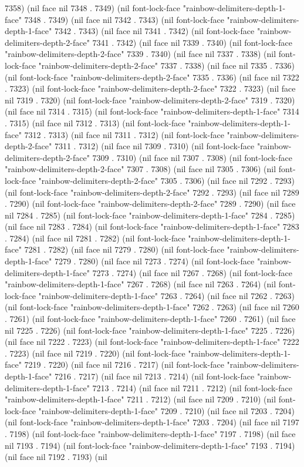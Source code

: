 7358) (nil face nil 7348 . 7349) (nil font-lock-face "rainbow-delimiters-depth-1-face" 7348 . 7349) (nil face nil 7342 . 7343) (nil font-lock-face "rainbow-delimiters-depth-1-face" 7342 . 7343) (nil face nil 7341 . 7342) (nil font-lock-face "rainbow-delimiters-depth-2-face" 7341 . 7342) (nil face nil 7339 . 7340) (nil font-lock-face "rainbow-delimiters-depth-2-face" 7339 . 7340) (nil face nil 7337 . 7338) (nil font-lock-face "rainbow-delimiters-depth-2-face" 7337 . 7338) (nil face nil 7335 . 7336) (nil font-lock-face "rainbow-delimiters-depth-2-face" 7335 . 7336) (nil face nil 7322 . 7323) (nil font-lock-face "rainbow-delimiters-depth-2-face" 7322 . 7323) (nil face nil 7319 . 7320) (nil font-lock-face "rainbow-delimiters-depth-2-face" 7319 . 7320) (nil face nil 7314 . 7315) (nil font-lock-face "rainbow-delimiters-depth-1-face" 7314 . 7315) (nil face nil 7312 . 7313) (nil font-lock-face "rainbow-delimiters-depth-1-face" 7312 . 7313) (nil face nil 7311 . 7312) (nil font-lock-face "rainbow-delimiters-depth-2-face" 7311 . 7312) (nil face nil 7309 . 7310) (nil font-lock-face "rainbow-delimiters-depth-2-face" 7309 . 7310) (nil face nil 7307 . 7308) (nil font-lock-face "rainbow-delimiters-depth-2-face" 7307 . 7308) (nil face nil 7305 . 7306) (nil font-lock-face "rainbow-delimiters-depth-2-face" 7305 . 7306) (nil face nil 7292 . 7293) (nil font-lock-face "rainbow-delimiters-depth-2-face" 7292 . 7293) (nil face nil 7289 . 7290) (nil font-lock-face "rainbow-delimiters-depth-2-face" 7289 . 7290) (nil face nil 7284 . 7285) (nil font-lock-face "rainbow-delimiters-depth-1-face" 7284 . 7285) (nil face nil 7283 . 7284) (nil font-lock-face "rainbow-delimiters-depth-1-face" 7283 . 7284) (nil face nil 7281 . 7282) (nil font-lock-face "rainbow-delimiters-depth-1-face" 7281 . 7282) (nil face nil 7279 . 7280) (nil font-lock-face "rainbow-delimiters-depth-1-face" 7279 . 7280) (nil face nil 7273 . 7274) (nil font-lock-face "rainbow-delimiters-depth-1-face" 7273 . 7274) (nil face nil 7267 . 7268) (nil font-lock-face "rainbow-delimiters-depth-1-face" 7267 . 7268) (nil face nil 7263 . 7264) (nil font-lock-face "rainbow-delimiters-depth-1-face" 7263 . 7264) (nil face nil 7262 . 7263) (nil font-lock-face "rainbow-delimiters-depth-1-face" 7262 . 7263) (nil face nil 7260 . 7261) (nil font-lock-face "rainbow-delimiters-depth-1-face" 7260 . 7261) (nil face nil 7225 . 7226) (nil font-lock-face "rainbow-delimiters-depth-1-face" 7225 . 7226) (nil face nil 7222 . 7223) (nil font-lock-face "rainbow-delimiters-depth-1-face" 7222 . 7223) (nil face nil 7219 . 7220) (nil font-lock-face "rainbow-delimiters-depth-1-face" 7219 . 7220) (nil face nil 7216 . 7217) (nil font-lock-face "rainbow-delimiters-depth-1-face" 7216 . 7217) (nil face nil 7213 . 7214) (nil font-lock-face "rainbow-delimiters-depth-1-face" 7213 . 7214) (nil face nil 7211 . 7212) (nil font-lock-face "rainbow-delimiters-depth-1-face" 7211 . 7212) (nil face nil 7209 . 7210) (nil font-lock-face "rainbow-delimiters-depth-1-face" 7209 . 7210) (nil face nil 7203 . 7204) (nil font-lock-face "rainbow-delimiters-depth-1-face" 7203 . 7204) (nil face nil 7197 . 7198) (nil font-lock-face "rainbow-delimiters-depth-1-face" 7197 . 7198) (nil face nil 7193 . 7194) (nil font-lock-face "rainbow-delimiters-depth-1-face" 7193 . 7194) (nil face nil 7192 . 7193) (nil 